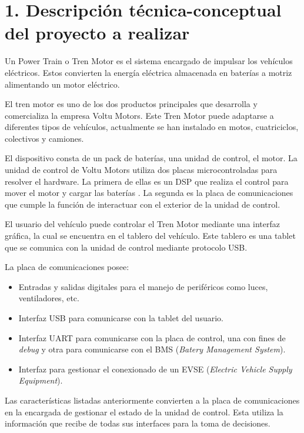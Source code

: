 \documentclass[
11pt, %
codirector, %
]{charter}
\begin{document}
\section{1. Descripción técnica-conceptual del proyecto a realizar}
\label{sec:descripcion}


Un Power Train o Tren Motor es el sistema encargado de impulsar los vehículos eléctricos. Estos convierten la energía eléctrica almacenada en baterías a motriz alimentando un motor eléctrico.

El tren motor es uno de los dos productos principales que desarrolla y comercializa la empresa Voltu Motors. Este Tren Motor puede adaptarse a diferentes tipos de vehículos, actualmente se han instalado en motos, cuatriciclos, colectivos y camiones.

El dispositivo consta de un pack de baterías, una unidad de control, el motor. La unidad de control de Voltu Motors utiliza dos placas microcontroladas para resolver el hardware.
La primera de ellas es un DSP que realiza el control para mover el motor y cargar las baterías . La segunda es la placa de comunicaciones que cumple la función de interactuar con el exterior de la unidad de control.

El usuario del vehículo puede controlar el Tren Motor mediante una interfaz gráfica, la cual se encuentra en el tablero del vehículo. Este tablero es una tablet que se comunica con la unidad de control mediante protocolo USB.

La placa de comunicaciones posee:

\begin{itemize}
	\item Entradas y salidas digitales para el manejo de periféricos como luces, ventiladores, etc.
	\item Interfaz USB para comunicarse con la tablet del usuario.
	\item Interfaz UART para comunicarse con la placa de control, una con fines de \textit{debug} y otra para comunicarse con el BMS (\textit{Batery Management System}).
	\item Interfaz para gestionar el conexionado de un EVSE (\textit{Electric Vehicle Supply Equipment}).
\end{itemize}

Las características listadas anteriormente convierten a la placa de comunicaciones en la encargada de gestionar el estado de la unidad de control. Esta utiliza la información que recibe de todas sus interfaces para la toma de decisiones.
\end{document}
